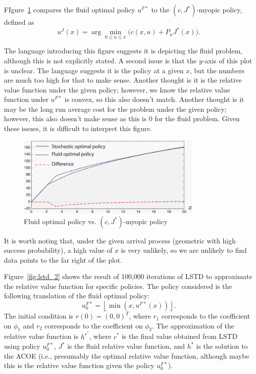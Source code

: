 \documentclass[11pt]{article}
\begin{document}
FIgure~\ref{fig:fluid_opt} compares the fluid optimal policy $u^{F*}$ to the $(c,J^*)$-myopic policy, defined as
$$u^J(x) = \arg \min_{0\leq u\leq x} \Big(c(x,u)  + P_u J^*(x)\Big).$$

The language introducing this figure suggests it is depicting the fluid problem, although this is not explicitly stated. A second issue is that the $y$-axis of this plot is unclear. The language suggests it is the policy at a given $x$, but the numbers are much too high for that to make sense. Another thought is it is the relative value function under the given policy; however, we know the relative value function under $u^{F*}$ is convex, so this also doesn't match. Another thought is it may be the long run average cost for the problem under the given policy; however, this also doesn't make sense as this is 0 for the fluid problem. Given these issues, it is difficult to interpret this figure.

\begin{center}
\begin{figure}
\includegraphics[width=9cm]{fluid_optimal_compare}
\caption{Fluid optimal policy vs. $(c,J^*)$-myopic policy}\label{fig:fluid_opt}
\end{figure}
\end{center}

It is worth noting that, under the given arrival process (geometric with high success probability), a high value of $x$ is very unlikely, so we are unlikely to find data points to the far right of the plot.


Figure~\ref{fig:lstd_2} shows the result of 100,000 iterations of LSTD to approximate the relative value function for specific policies. The policy considered is the following translation of the fluid optimal policy:
$$u_0^{F*} = \left \lfloor{\min(x,u^{F*}(x))}\right \rfloor.$$
The initial condition is $r(0)=(0,0)^T$, where $r_1$ corresponds to the coefficient on $\phi_1$ and $r_2$ corresponds to the coefficient on $\phi_2$. The approximation of the relative value function is $h^{r^*}$, where $r^*$ is the final value obtained from LSTD using policy $u_0^{F*}$, $J^*$ is the fluid relative value function, and $h^*$ is the solution to the ACOE (i.e., presumably the optimal relative value function, although maybe this is the relative value function given the policy $u_0^{F*}$).
\end{document}

